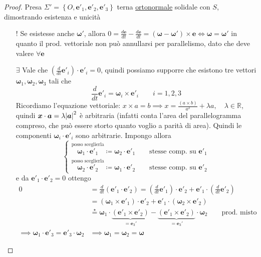 \documentclass[a4paper,10pt]{article}
\theoremstyle{definition}
\newcommand{\noun}[1]{\textsc{#1}}
\newcommand{\bv}{\boldsymbol} %
\newcommand{\re}{\mathbb{R}} %
\theoremstyle{indentdefinition}
\theoremstyle{indenttheorem}
\theoremstyle{myremark}
\theoremstyle{indentgeneral}
\begin{document}
\begin{proof}
Presa $\Sigma'=\left\{ O,\boldsymbol{e}'_{1},\boldsymbol{e}'_{2},\boldsymbol{e}'_{3}\right\} $
terna \underline{ortonormale} solidale con $S$, dimostrando esistenza e unicità
\begin{itemize}
\item[\noun{$!$}] \noun{} Se esistesse anche $\boldsymbol{\omega}'$, allora $0=\frac{d\boldsymbol{e}}{dt}-\frac{d\boldsymbol{e}}{dt}=\left(\boldsymbol{\omega}-\boldsymbol{\omega}'\right)\times\boldsymbol{e} \iff
\boldsymbol{\omega}=\boldsymbol{\omega}'$ in quanto il prod. vettoriale non può annullarsi per parallelismo, dato che deve valere $\forall\bv{e}$
\item[\noun{$\exists$}] \noun{} Vale che $\left(\frac{d}{dt}\boldsymbol{e}'_{i}\right)\cdot\boldsymbol{e}'_{i}=0$,
quindi possiamo supporre che esistono tre vettori $\bv{\omega}_1,\bv{\omega}_2,\bv{\omega}_3$ tali che $$\frac{d}{dt}\boldsymbol{e}'_{i}=\boldsymbol{\omega}_{i}\times\boldsymbol{e}'_{i} \qquad i=1,2,3$$
Ricordiamo l'equazione vettoriale: $x\times a=b \implies
x=\frac{\left(a\times b\right)}{a^{2}}+\lambda a, \quad\lambda\in\re
$, quindi $\bv{x}\cdot \bv{a}=\lambda\abs{\bv{a}}^2$ è arbitraria (infatti conta l'area del parallelogramma compreso, che può essere storto quanto voglio a parità di area). Quindi le componenti $\boldsymbol{\omega}_{i}\cdot\boldsymbol{e}'_{i}$
sono arbitrarie. Impongo allora $$\begin{cases}
\overset{\text{posso sceglierla}}{\boxed{\boldsymbol{\omega}_{1}\cdot\boldsymbol{e}'_{1}}}\coloneqq\boldsymbol{\omega}_{2}\cdot\boldsymbol{e}'_{1} \qquad\text{stesse comp. su $\boldsymbol{e}'_{1}$}\\  
\overset{\text{posso sceglierla}}{\boxed{\boldsymbol{\omega}_{2}\cdot\boldsymbol{e}'_{2}}}\coloneqq
\boldsymbol{\omega}_{1}\cdot\boldsymbol{e}'_{2}\qquad\text{stesse comp. su $\boldsymbol{e}'_{2}$}
\end{cases}$$ 
e da $\boldsymbol{e}'_{1}\cdot\boldsymbol{e}'_{2}=0$ ottengo
\begin{align*}
0 &=\frac{d}{dt}\left(\boldsymbol{e}'_{1}\cdot\boldsymbol{e}'_{2}\right)=\left(\frac{d}{dt}\boldsymbol{e}'_{1}\right)\cdot\boldsymbol{e}'_{2}+\boldsymbol{e}'_{1}\cdot\left(\frac{d}{dt}\boldsymbol{e}'_{2}\right)  \\
&=\left(\boldsymbol{\omega}_{1}\times\boldsymbol{e}'_{1}\right)\cdot\boldsymbol{e}'_{2}+\boldsymbol{e}'_{1}\cdot\left(\boldsymbol{\omega}_{2}\times\boldsymbol{e}'_{2}\right)\\
&\overset{\star}{=}\boldsymbol{\omega}_{1}\cdot\underbrace{\left(\boldsymbol{e}'_{1}\times\boldsymbol{e}'_{2}\right)}_{=\bv{e}_3'}-\underbrace{\left(\boldsymbol{e}'_{1}\times\boldsymbol{e}'_{2}\right)}_{=\bv{e}_3'}\cdot\boldsymbol{\omega}_{2} \qquad\text{prod. misto}\\
\implies\boldsymbol{\omega}_{1}\cdot\boldsymbol{e}'_{3}=\boldsymbol{e}'_{3}\cdot\boldsymbol{\omega}_{2}&\implies\boxed{\boldsymbol{\omega}_{1}=\boldsymbol{\omega}_{2}=\boldsymbol{\omega}}
\end{align*}


\end{itemize}
\end{proof}
\end{document}
